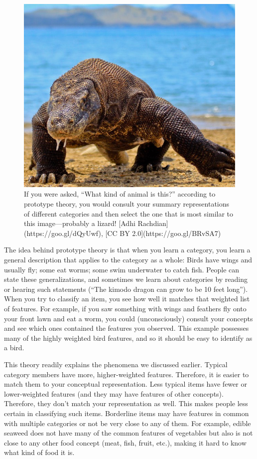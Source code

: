 \documentclass[
]{krantz}
\begin{document}
\begin{figure}

{\centering \includegraphics[width=0.6\linewidth]{images/ch7/lizard} 

}

\caption{If you were asked, “What kind of animal is this?” according to prototype theory, you would consult your summary representations of different categories and then select the one that is most similar to this image—probably a lizard! [Adhi Rachdian](https://goo.gl/dQyUwf), [CC BY 2.0](https://goo.gl/BRvSA7)}\label{fig:lizard}
\end{figure}

The idea behind prototype theory is that when you learn a category, you learn a general description that applies to the category as a whole: Birds have wings and usually fly; some eat worms; some swim underwater to catch fish. People can state these generalizations, and sometimes we learn about categories by reading or hearing such statements (``The kimodo dragon can grow to be 10 feet long'').
When you try to classify an item, you see how well it matches that weighted list of features. For example, if you saw something with wings and feathers fly onto your front lawn and eat a worm, you could (unconsciously) consult your concepts and see which ones contained the features you observed. This example possesses many of the highly weighted bird features, and so it should be easy to identify as a bird.

This theory readily explains the phenomena we discussed earlier. Typical category members have more, higher-weighted features. Therefore, it is easier to match them to your conceptual representation. Less typical items have fewer or lower-weighted features (and they may have features of other concepts). Therefore, they don't match your representation as well. This makes people less certain in classifying such items. Borderline items may have features in common with multiple categories or not be very close to any of them. For example, edible seaweed does not have many of the common features of vegetables but also is not close to any other food concept (meat, fish, fruit, etc.), making it hard to know what kind of food it is.
\end{document}
